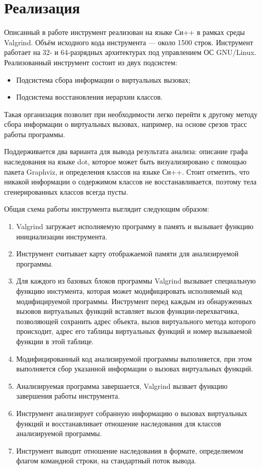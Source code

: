 \documentclass[a4paper,12pt,russian]{article}
\newcommand{\code}[1]{\textsf{#1}}
\begin{document}
\newpage
\section{Реализация}
Описанный в работе инструмент реализован на языке Си++ в рамках среды \code{Valgrind}. Объём исходного кода инструмента --- около 1500 строк.
Инструмент работает на 32- и 64-разрядных архитектурах под управлением ОС \code{GNU/Linux}.
Реализованный инструмент состоит из двух подсистем:
\begin{itemize}
    \item Подсистема сбора информации о виртуальных вызовах;
    \item Подсистема восстановления иерархии классов.
\end{itemize}
Такая организация позволит при необходимости легко перейти к другому методу сбора информации о виртуальных вызовах, например, на основе срезов трасс работы программы.

Поддерживается два варианта для вывода результата анализа: описание графа наследования на языке \code{dot}, которое может быть визуализировано с помощью пакета \code{Graphviz}, и определения классов на языке Си++.
Стоит отметить, что никакой информации о содержимом классов не восстанавливается, поэтому тела сгенерированных классов всегда пусты.

Общая схема работы инструмента выглядит следующим образом:
\begin{enumerate}
    \item \code{Valgrind} загружает исполняемую программу в память и вызывает функцию инициализации инструмента.
    \item Инструмент считывает карту отображаемой памяти для анализируемой программы.
    \item Для каждого из базовых блоков программы \code{Valgrind} вызывает специальную функцию инстумента, которая может модифицировать исполняемый код модифицируемой программы. Инструмент перед каждым из обнаруженных вызовов виртуальных функций вставляет вызов функции-пе\-ре\-хват\-чи\-ка, позволяющей сохранить адрес объекта, вызов виртуального метода которого происходит, адрес его таблицы виртуальных функций и номер вызываемой функции в этой таблице.
    \item Модифицированный код анализируемой программы выполняется, при этом выполняется сбор указанной информации о вызовах виртуальных функций.
    \item Анализируемая программа завершается, \code{Valgrind} вызвает функцию завершения работы инструмента.
    \item Инструмент анализирует собранную информацию о вызовах виртуальных функций и восстанавливает отношение наследования для классов анализируемой программы.
    \item Инструмент выводит отношение наследования в формате, определяемом флагом командной строки, на стандартный поток вывода.
\end{enumerate}
\end{document}
